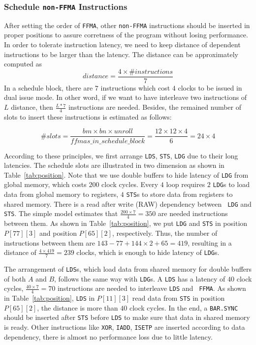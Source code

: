 \subsubsection{Schedule {\tt non-FFMA} Instructions}

After setting the order of {\tt FFMA}, other {\tt non-FFMA} instructions should be inserted in proper positions to assure
corretness of the program without losing performance. In order to tolerate instruction latency, we need to keep distance of dependent instructions to be larger than the latency. The distance can be approximately computed as
\begin{displaymath}
distance = \frac{4\times\#instructions}{7}
\end{displaymath}
In a schedule block, there are $7$ instructions which cost $4$ clocks to be issued in dual issue mode. In other word, if we want to have interleave
two instructions of $L$ distance, then $\frac{L*7}{4}$ instructions are needed. Besides, the remained number of slots to insert these instructions is estimated as follows:

\begin{displaymath}
\#slots = \frac{bm\times bn\times unroll}{ffmas\_in\_schedule\_block}=\frac{12\times 12\times 4}{6}=24\times 4
\end{displaymath}

According to these principles, we first arrange {\tt LDS}, {\tt STS}, {\tt LDG} due to their long latencies. The
schedule slots are illustrated in two dimension as shown in Table~\ref{tab:position}.
Note that we use double buffers to hide latency of {\tt LDG} from global memory, which costs $200$ clock cycles.
Every $4$ loop requires $2$ {\tt LDG}s to load data from global memory to registers, $4$ {\tt STS}s to store data from registers to shared memory. There is a read after write (RAW) dependency between {\tt
LDG} and {\tt STS}. The simple model estimates that $\frac{200\times 7}{4} = 350$ are needed instructions between them.
As shown in Table~\ref{tab:position}, we put {\tt LDG} and  {\tt STS} in position $P[77][3]$ and position $P[65][2]$, respectively. Thus, the number of instructions between them are $143-77 + 144\times 2 +
65=419$, resulting in a distance of $\frac{4\times 419}{7}=239$ clocks, which is enough to hide latency of {\tt LDG}s.

The arrangement of {\tt LDS}s, which load data from shared memory for double buffers of both $A$ and $B$, follows the same way with {\tt LDG}s.
A {\tt LDS} has a latency of $40$ clock cycles, $\frac{40\times 7}{4}=70$ instructions are needed to interleave {\tt LDS} and {\tt
FFMA}. As shown in Table~\ref{tab:position}, {\tt LDS} in $P[11][3]$ read data from {\tt STS} in position $P[65][2]$, the distance is more than $40$ clock
cycles. In the end, a {\tt BAR.SYNC} should be inserted after {\tt STS} before {\tt LDS} to make sure that data in shared memory is ready. Other instructions like {\tt XOR},
{\tt IADD}, {\tt ISETP} are inserted according to data dependency, there is almost no performance loss due to little latency.


